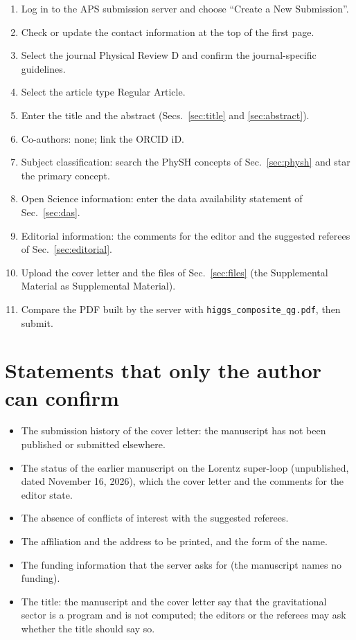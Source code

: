\documentclass[11pt]{article}
\begin{document}
\begin{enumerate}
\item Log in to the APS submission server and choose ``Create a New Submission''.
\item Check or update the contact information at the top of the first page.
\item Select the journal Physical Review D and confirm the journal-specific guidelines.
\item Select the article type Regular Article.
\item Enter the title and the abstract (Secs.~\ref{sec:title} and \ref{sec:abstract}).
\item Co-authors: none; link the ORCID iD.
\item Subject classification: search the PhySH concepts of Sec.~\ref{sec:physh} and star the primary concept.
\item Open Science information: enter the data availability statement of Sec.~\ref{sec:das}.
\item Editorial information: the comments for the editor and the suggested referees of Sec.~\ref{sec:editorial}.
\item Upload the cover letter and the files of Sec.~\ref{sec:files} (the Supplemental Material as Supplemental Material).
\item Compare the PDF built by the server with \texttt{higgs\_composite\_qg.pdf}, then submit.
\end{enumerate}

\section{Statements that only the author can confirm}
\label{sec:confirm}

\begin{itemize}
\item The submission history of the cover letter: the manuscript has not been published or submitted elsewhere.
\item The status of the earlier manuscript on the Lorentz super-loop (unpublished, dated November 16, 2026), which the
cover letter and the comments for the editor state.
\item The absence of conflicts of interest with the suggested referees.
\item The affiliation and the address to be printed, and the form of the name.
\item The funding information that the server asks for (the manuscript names no funding).
\item The title: the manuscript and the cover letter say that the gravitational sector is a program and is not computed;
the editors or the referees may ask whether the title should say so.
\end{itemize}
\end{document}
